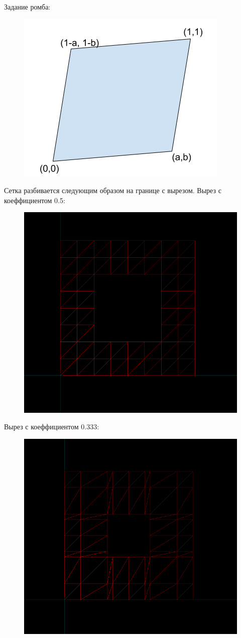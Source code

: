 \documentclass[a4paper, 12pt]{article}
\begin{document}
Задание ромба:
\begin{figure}[H]
    \includegraphics[]{paint2}
        \end{figure}
        Сетка разбивается следующим образом на границе с вырезом.
Вырез с коеффициентом 0.5:
\begin{figure}[H]
    \includegraphics[width=0.7\linewidth]{coef_0_5}
        \end{figure}
Вырез с коеффициентом 0.333:
\begin{figure}[H]
    \includegraphics[width=0.7\linewidth]{coef_0_333}
        \end{figure}
\end{document}
